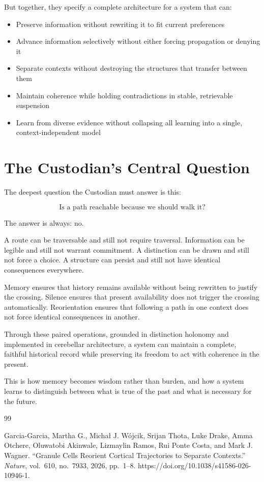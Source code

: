 \documentclass[12pt]{article}
\begin{document}
But together, they specify a complete architecture for a system that can:

\begin{itemize}
\item Preserve information without rewriting it to fit current preferences
\item Advance information selectively without either forcing propagation or denying it
\item Separate contexts without destroying the structures that transfer between them
\item Maintain coherence while holding contradictions in stable, retrievable suspension
\item Learn from diverse evidence without collapsing all learning into a single, context-independent model
\end{itemize}

\section{The Custodian's Central Question}

The deepest question the Custodian must answer is this:

\begin{equation}
\boxed{\text{Is a path reachable because we should walk it?}}
\end{equation}

The answer is always: no.

A route can be traversable and still not require traversal. Information can be legible and still not warrant commitment. A distinction can be drawn and still not force a choice. A structure can persist and still not have identical consequences everywhere.

Memory ensures that history remains available without being rewritten to justify the crossing. Silence ensures that present availability does not trigger the crossing automatically. Reorientation ensures that following a path in one context does not force identical consequences in another.

Through these paired operations, grounded in distinction holonomy and implemented in cerebellar architecture, a system can maintain a complete, faithful historical record while preserving its freedom to act with coherence in the present.

This is how memory becomes wisdom rather than burden, and how a system learns to distinguish between what is true of the past and what is necessary for the future.

\newpage

\begin{thebibliography}{99}

Garcia-Garcia, Martha G., Michał J. Wójcik, Srijan Thota, Luke Drake, Amma Otchere, Oluwatobi Akinwale, Lizmaylin Ramos, Rui Ponte Costa, and Mark J. Wagner. ``Granule Cells Reorient Cortical Trajectories to Separate Contexts.'' \textit{Nature}, vol.~610, no.~7933, 2026, pp.~1--8. https://doi.org/10.1038/s41586-026-10946-1.

\end{thebibliography}
\end{document}

